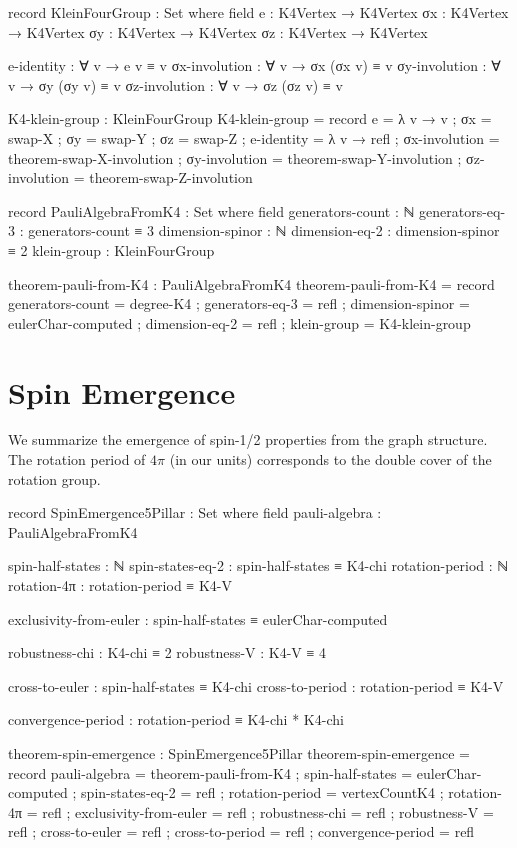 \documentclass[11pt,a4paper]{book}
\begin{document}
\begin{code}
record KleinFourGroup : Set where
  field
    e  : K4Vertex → K4Vertex
    σx : K4Vertex → K4Vertex
    σy : K4Vertex → K4Vertex
    σz : K4Vertex → K4Vertex
    
    e-identity : ∀ v → e v ≡ v
    σx-involution : ∀ v → σx (σx v) ≡ v
    σy-involution : ∀ v → σy (σy v) ≡ v
    σz-involution : ∀ v → σz (σz v) ≡ v

K4-klein-group : KleinFourGroup
K4-klein-group = record
  { e  = λ v → v
  ; σx = swap-X
  ; σy = swap-Y
  ; σz = swap-Z
  ; e-identity = λ v → refl
  ; σx-involution = theorem-swap-X-involution
  ; σy-involution = theorem-swap-Y-involution
  ; σz-involution = theorem-swap-Z-involution
  }

record PauliAlgebraFromK4 : Set where
  field
    generators-count : ℕ
    generators-eq-3  : generators-count ≡ 3
    dimension-spinor : ℕ
    dimension-eq-2   : dimension-spinor ≡ 2
    klein-group      : KleinFourGroup

theorem-pauli-from-K4 : PauliAlgebraFromK4
theorem-pauli-from-K4 = record
  { generators-count = degree-K4
  ; generators-eq-3  = refl
  ; dimension-spinor = eulerChar-computed
  ; dimension-eq-2   = refl
  ; klein-group      = K4-klein-group
  }
\end{code}

\section{Spin Emergence}

We summarize the emergence of spin-1/2 properties from the graph structure. The rotation period of $4\pi$ (in our units) corresponds to the double cover of the rotation group.

\begin{code}
record SpinEmergence5Pillar : Set where
  field
    pauli-algebra    : PauliAlgebraFromK4
    
    spin-half-states : ℕ
    spin-states-eq-2 : spin-half-states ≡ K4-chi
    rotation-period  : ℕ
    rotation-4π      : rotation-period ≡ K4-V
    
    exclusivity-from-euler : spin-half-states ≡ eulerChar-computed
    
    robustness-chi : K4-chi ≡ 2
    robustness-V : K4-V ≡ 4
    
    cross-to-euler : spin-half-states ≡ K4-chi
    cross-to-period : rotation-period ≡ K4-V
    
    convergence-period : rotation-period ≡ K4-chi * K4-chi

theorem-spin-emergence : SpinEmergence5Pillar
theorem-spin-emergence = record
  { pauli-algebra    = theorem-pauli-from-K4
  ; spin-half-states = eulerChar-computed
  ; spin-states-eq-2 = refl
  ; rotation-period  = vertexCountK4
  ; rotation-4π      = refl
  ; exclusivity-from-euler = refl
  ; robustness-chi = refl
  ; robustness-V = refl
  ; cross-to-euler = refl
  ; cross-to-period = refl
  ; convergence-period = refl
  }
\end{code}
\end{document}
